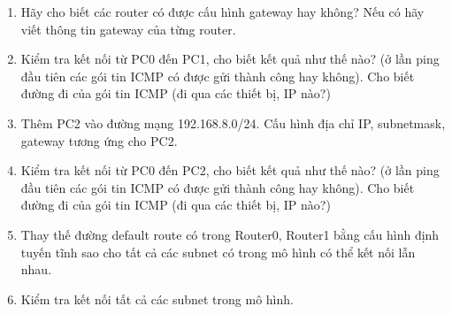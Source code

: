 \begin{enumerate}
\bf \item Hãy cho biết các router có được cấu hình gateway hay không? Nếu có hãy viết thông tin gateway của từng router.

\rm

\bf \item Kiểm tra kết nối từ PC0 đến PC1, cho biết kết quả như thế nào? (ở lần ping đầu tiên các gói tin ICMP có được gửi thành công hay không). Cho biết đường đi của gói tin ICMP (đi qua các thiết bị, IP nào?)

\rm

\bf \item Thêm PC2 vào đường mạng 192.168.8.0/24. Cấu hình địa chỉ IP, subnetmask, gateway tương ứng cho PC2.

\rm

\bf \item Kiểm tra kết nối từ PC0 đến PC2, cho biết kết quả như thế nào? (ở lần ping đầu tiên các gói tin ICMP có được gửi thành công hay không). Cho biết đường đi của gói tin ICMP (đi qua các thiết bị, IP nào?)

\rm

\bf \item Thay thế đường default route có trong Router0, Router1 bằng cấu hình định tuyến tĩnh sao cho tất cả các subnet có trong mô hình có thể kết nối lẫn nhau.

\rm

\bf \item Kiểm tra kết nối tất cả các subnet trong mô hình.
\end{enumerate}
